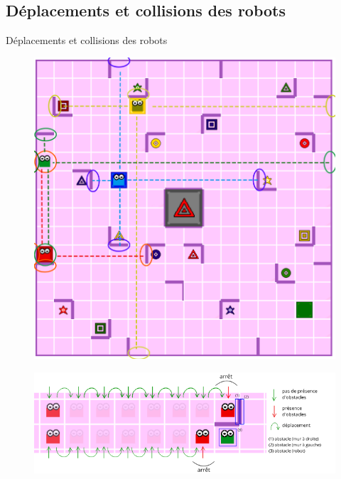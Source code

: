 \documentclass{beamer}
\begin{document}
    \subsection{Déplacements et collisions des robots}
        \begin{frame}{Déplacements et collisions des robots}
            \begin{figure}[H]
                \centering
                \includegraphics[scale=0.15]{images/collision.png}
            \end{figure}
            
            \begin{figure}[H]
                \centering
                \includegraphics[scale=0.4]{images/deplacements.png}
            \end{figure}
        \end{frame}
\end{document}
